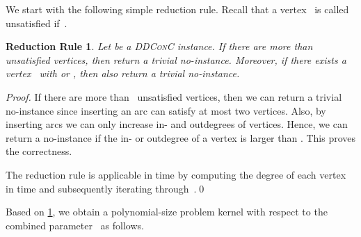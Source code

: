 \documentclass[a4paper,11pt]{article}
\theoremstyle{remark}
\theoremstyle{plain}
\newtheorem{theorem}{Theorem}
\newtheorem{lemma}[theorem]{Lemma}
\newtheorem{rrule}{Reduction Rule}[section]
\theoremstyle{definition}
\newcommand{\DDCC}{\textsc{DDConC}\xspace}
\begin{document}
We start with the following simple reduction rule.
Recall that a vertex~ is called unsatisfied if~.
  
\begin{rrule}\label{rr:DDCCtrivialNO}
  Let  be a \DDCC instance.
  If there are more than~ unsatisfied vertices, then return a trivial no-instance.
  Moreover, if there exists a vertex~ with  or , then also return a trivial no-instance.
\end{rrule}


\begin{proof}
  If there are more than~ unsatisfied vertices, then we can return a trivial no-instance since
  inserting an arc can satisfy at most two vertices.
  Also, by inserting arcs we can only increase in- and outdegrees of vertices. Hence, we can return a no-instance if the in- or outdegree of a vertex is larger than .
  This proves the correctness.
  
  The reduction rule is applicable in  time by computing the degree of each vertex in  time and subsequently iterating through~.\qed
\end{proof}

Based on \cref{rr:DDCCtrivialNO}, we obtain a polynomial-size
problem kernel with respect to the combined parameter~ as follows.


\end{document}
